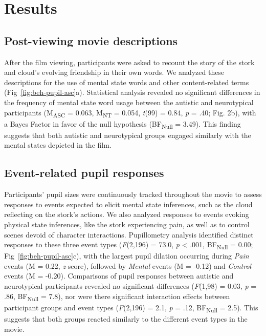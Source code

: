 \section{Results}
\subsection{Post-viewing movie descriptions }
After the film viewing, participants were asked to recount the story of the stork and cloud's evolving friendship in their own words. We analyzed these descriptions for the use of mental state words and other content-related terms (Fig~\ref{fig:beh-pupil-asc}a). Statistical analysis revealed no significant differences in the frequency of mental state word usage between the autistic and neurotypical participants (M\textsubscript{ASC} = 0.063, M\textsubscript{NT} = 0.054, \textit{t}(99) = 0.84, \textit{p} = .40; Fig. 2b), with a Bayes Factor in favor of the null hypothesis (BF\textsubscript{Null} = 3.49). This finding suggests that both autistic and neurotypical groups engaged similarly with the mental states depicted in the film.



\subsection{Event-related pupil responses}
Participants' pupil sizes were continuously tracked throughout the movie to assess responses to events expected to elicit mental state inferences, such as the cloud reflecting on the stork's actions. We also analyzed responses to events evoking physical state inferences, like the stork experiencing pain, as well as to control scenes devoid of character interactions. Pupillometry analysis identified distinct responses to these three event types (\textit{F}(2,196) = 73.0, \textit{p} < .001, BF\textsubscript{Null} = 0.00; Fig~\ref{fig:beh-pupil-asc}c), with the largest pupil dilation occurring during \textit{Pain} events (M = 0.22, \textit{z}-score), followed by \textit{Mental} events (M = -0.12) and \textit{Control} events (M = -0.20). Comparisons of pupil responses between autistic and neurotypical participants revealed no significant differences (\textit{F}(1,98) = 0.03, \textit{p} = .86, BF\textsubscript{Null} = 7.8), nor were there significant interaction effects between participant groups and event types (\textit{F}(2,196) = 2.1, \textit{p} = .12, BF\textsubscript{Null} = 2.5). This suggests that both groups reacted similarly to the different event types in the movie.

